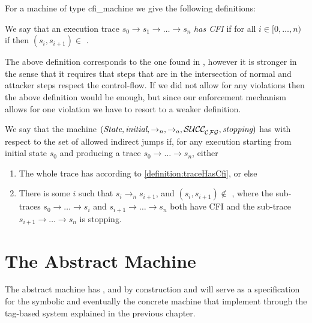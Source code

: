 For a machine of type cfi\_machine we give the following definitions:

\begin{definition}\label{definition:traceHasCfi}
  We say that an execution trace $s_0 \to s_1 \to \ldots \to s_n$ {\em has CFI}
  if for all $ i \in [0,\ldots,n)$ if  then
  $(s_i,s_{i+1}) \in$ \SUCC .
\end{definition}


The above definition corresponds to the one found in \cite{abadi2005}, however
it is stronger in the sense that it requires that steps that are in the
intersection of normal and attacker steps respect the control-flow. If we did
not allow for any violations then the above definition would be enough, but
since our enforcement mechanism allows for one violation we have to resort to a
weaker definition.

\begin{definition}[CFI]\label{definition:CFI}
  We say that the machine
  $(\textit{State}, \textit{initial}, \to_n,\allowbreak \to_a, \mathcal{SUCC_\mathcal{CFG}^{}}, \textit{stopping})$
  has \CFI with respect to the set of allowed indirect jumps \CFG
  if, for any execution starting from initial state $s_0$
  and producing a trace $s_0 \to \ldots \to s_n$, either
  \begin{enumerate}
  \item The whole trace has \CFI according to
    \ref{definition:traceHasCfi}, or else
  \item There is some $i$ such that $s_i \to_n s_{i+1}$,
  and $(s_i, s_{i+1}) \not \in$ \SUCC{}, where
  the sub-traces $s_0 \to \ldots \to s_i$ and
  $s_{i+1} \to \ldots \to s_n$ both have CFI
  and the sub-trace $s_{i+1} \to \ldots \to s_n$ is stopping.
  \end{enumerate}
\end{definition}

\section{The Abstract Machine}\label{sec:abstract_cfi}

The abstract machine
has \CFI, \NXD and \NWC by construction and will serve as a 
specification for the symbolic and eventually the concrete machine that
implement \CFI through the tag-based system explained in the previous chapter.

